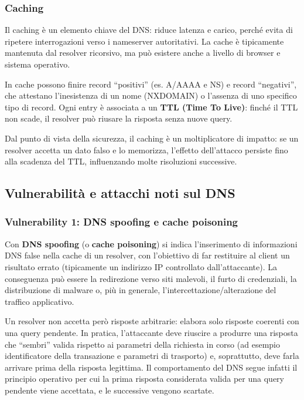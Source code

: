 \subsubsection{Caching}
Il caching è un elemento chiave del DNS: riduce latenza e carico, perché evita di ripetere interrogazioni verso i nameserver autoritativi. La cache è tipicamente mantenuta dal resolver ricorsivo, ma può esistere anche a livello di browser e sistema operativo.

In cache possono finire record “positivi” (es. A/AAAA e NS) e record “negativi”, che attestano l’inesistenza di un nome (NXDOMAIN) o l’assenza di uno specifico tipo di record. Ogni entry è associata a un \textbf{TTL (Time To Live)}: finché il TTL non scade, il resolver può riusare la risposta senza nuove query.

Dal punto di vista della sicurezza, il caching è un moltiplicatore di impatto: se un resolver accetta un dato falso e lo memorizza, l’effetto dell’attacco persiste fino alla scadenza del TTL, influenzando molte risoluzioni successive.

\subsection{Vulnerabilità e attacchi noti sul DNS}

\subsubsection{Vulnerability 1: DNS spoofing e cache poisoning}
Con \textbf{DNS spoofing} (o \textbf{cache poisoning}) si indica l’inserimento di informazioni DNS false nella cache di un resolver, con l’obiettivo di far restituire al client un risultato errato (tipicamente un indirizzo IP controllato dall’attaccante). La conseguenza può essere la redirezione verso siti malevoli, il furto di credenziali, la distribuzione di malware o, più in generale, l’intercettazione/alterazione del traffico applicativo.

Un resolver non accetta però risposte arbitrarie: elabora solo risposte coerenti con una query pendente. In pratica, l’attaccante deve riuscire a produrre una risposta che “sembri” valida rispetto ai parametri della richiesta in corso (ad esempio identificatore della transazione e parametri di trasporto) e, soprattutto, deve farla arrivare prima della risposta legittima. Il comportamento del DNS segue infatti il principio operativo per cui la prima risposta considerata valida per una query pendente viene accettata, e le successive vengono scartate.

